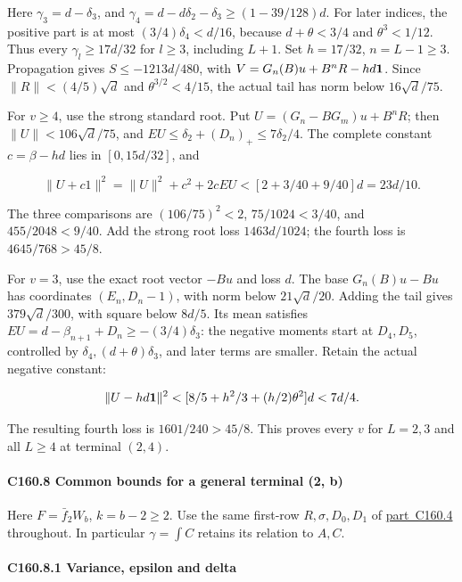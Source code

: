Here \(\gamma_3=d-\delta_3\), and \(\gamma_4=d-d\delta_2-\delta_3\ge(1-39/128)d\). For later indices, the positive part is at most \((3/4)\delta_4<d/16\), because \(d+\theta<3/4\) and \(\theta^3<1/12\). Thus every \(\gamma_l\ge17d/32\) for \(l\ge3\), including \(L+1\). Set \(h=17/32\), \(n=L-1\ge3\). Propagation gives \(S\le-1213d/480\), with \(V=G_n(B)u+B^nR-hd\mathbf1\). Since \(\|R\|<(4/5)\sqrt d\) and \(\theta^{3/2}<4/15\), the actual tail has norm below \(16\sqrt d/75\).

For \(v\ge4\), use the strong standard root. Put \(U=(G_n-BG_m)u+B^nR\); then \(\|U\|<106\sqrt d/75\), and \(EU\le \delta_2+(D_n)_+\le7\delta_2/4\). The complete constant \(c=\beta-hd\) lies in \([0,\allowbreak \allowbreak  15d/32]\), and

\[
\|U+c1\|^2=\|U\|^2+c^2+2c EU
<[2+3/40+9/40]d=23d/10.
\]

The three comparisons are \((106/75)^2<2\), \(75/1024<3/40\), and \(455/2048<9/40\). Add the strong root loss \(1463d/1024\); the fourth loss is \(4645/768>45/8\).

For \(v=3\), use the exact root vector \(-Bu\) and loss \(d\). The base \(G_n(B)u-Bu\) has coordinates \((E_n,\allowbreak \allowbreak  D_n-1)\), with norm below \(21\sqrt d/20\). Adding the tail gives \(379\sqrt d/300\), with square below \(8d/5\). Its mean satisfies \(EU=d-\beta_{n+1}+D_n\ge-(3/4)\delta_3\): the negative moments start at \(D_4,\allowbreak \allowbreak  D_5\), controlled by \(\delta_4,\allowbreak \allowbreak (d+\theta)\delta_3\), and later terms are smaller. Retain the actual negative constant:

\[
\|U-hd\mathbf1\|^2<[8/5+h^2/3+(h/2)\theta^2]d<7d/4.
\]

The resulting fourth loss is \(1601/240>45/8\). This proves every \(v\) for \(L=2,\allowbreak \allowbreak  3\) and all \(L\ge4\) at terminal \((2,\allowbreak \allowbreak  4)\).

\paragraph{C160.8 Common bounds for a general terminal (2, b)}

Here \(F=\bar f_2W_b\), \(k=b-2\ge2\). Use the same first-row \(R,\allowbreak \allowbreak  \sigma,\allowbreak \allowbreak  D_0,\allowbreak \allowbreak  D_1\) of \mbox{\hyperref[part:C160.4]{part C160.4}} throughout. In particular \(\gamma=\int C\) retains its relation to \(A,\allowbreak \allowbreak  C\).

\paragraph{C160.8.1 Variance, epsilon and delta}

